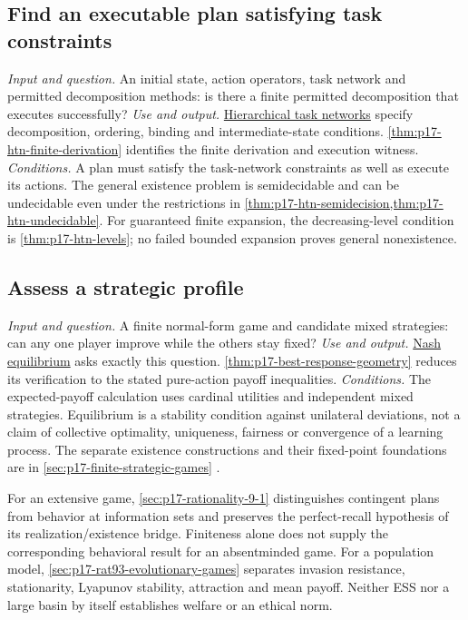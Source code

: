 \subsection{Find an executable plan satisfying task constraints}
\label{sec:p14-finder-planning}
\textit{Input and question.} An initial state, action operators, task network
and permitted decomposition methods: is there a finite permitted
decomposition that executes successfully?
\textit{Use and output.}
\hyperref[sec:p17-hierarchical-task-network-reasoning]{Hierarchical task
networks} specify decomposition, ordering, binding and intermediate-state
conditions. \cref{thm:p17-htn-finite-derivation} identifies the finite
derivation and execution witness.
\textit{Conditions.} A plan must satisfy the task-network constraints as well
as execute its actions. The general existence problem is semidecidable and
can be undecidable even under the restrictions in
\cref{thm:p17-htn-semidecision,thm:p17-htn-undecidable}.
For guaranteed finite expansion, the decreasing-level condition is
\cref{thm:p17-htn-levels}; no failed bounded expansion proves general
nonexistence.

\subsection{Assess a strategic profile}
\label{sec:p14-finder-games}
\textit{Input and question.} A finite normal-form game and candidate mixed
strategies: can any one player improve while the others stay fixed?
\textit{Use and output.}
\hyperref[def:p17-nash-equilibrium]{Nash equilibrium} asks exactly this
question. \cref{thm:p17-best-response-geometry} reduces its verification to
the stated pure-action payoff inequalities.
\textit{Conditions.} The expected-payoff calculation uses cardinal utilities
and independent mixed strategies. Equilibrium is a stability condition against
unilateral deviations, not a claim of collective optimality, uniqueness,
fairness or convergence of a learning process. The separate existence
constructions and their fixed-point foundations are in
\cref{sec:p17-finite-strategic-games}
\cite{Nash1950EquilibriumPoints,Nash1951NonCooperative}.

For an extensive game, \cref{sec:p17-rationality-9-1} distinguishes
contingent plans from behavior at information sets and preserves the
perfect-recall hypothesis of its realization/existence bridge. Finiteness
alone does not supply the corresponding behavioral result for an
absentminded game. For a population model,
\cref{sec:p17-rat93-evolutionary-games} separates invasion resistance, stationarity,
Lyapunov stability, attraction and mean payoff. Neither ESS nor a large
basin by itself establishes welfare or an ethical norm.

